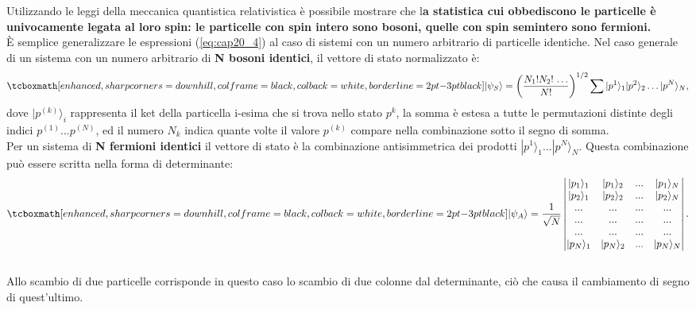 Utilizzando le leggi della meccanica quantistica relativistica è possibile mostrare che l\textbf{a statistica cui obbediscono le particelle è univocamente legata al loro spin: le particelle con spin intero sono bosoni, quelle con spin semintero sono fermioni.}\\

È semplice generalizzare le espressioni (\ref{eq:cap20_4}) al caso di sistemi con un numero arbitrario di particelle identiche. Nel caso generale di un sistema con un numero arbitrario di \textbf{N bosoni identici}, il vettore di stato normalizzato è:\\
	\begin{equation}
		\tcboxmath[enhanced, sharp corners=downhill, colframe=black, colback=white, borderline={2pt}{-3pt}{black}]{
			|\psi _S\rangle= \left(\frac{N_{1}! N_{2}!\,\dots}{N!}\right)^{1/2}   \sum  |p^1\rangle_{1} |p^2\rangle_{2} \dots |p^N\rangle_{N} , 
			}
	\end{equation}
dove $|p^{(k)}\rangle_i$ rappresenta il ket della particella i-esima che si trova nello stato $p^k$, la somma \`e estesa a tutte le permutazioni distinte degli indici $p^{(1)}...p^{(N)}$, ed il numero $N_{k}$ indica quante volte il valore $p^{(k)}$ compare nella combinazione sotto il segno di somma.\\

Per un sistema di \textbf{N fermioni identici} il vettore di stato \`e la combinazione antisimmetrica dei prodotti $|p^1\rangle_1...|p^N\rangle_N$. Questa combinazione pu\`o essere scritta nella forma di determinante:
	\begin{equation}
		\tcboxmath[enhanced, sharp corners=downhill, colframe=black, colback=white, borderline={2pt}{-3pt}{black}]{
			|\psi _A\rangle= \frac{1}{\sqrt{N}} \begin{vmatrix} |p_{1}\rangle_1 & |p_{1}\rangle_2 & ... & |p_{1}\rangle_N \\|p_{2}\rangle_1 & |p_{2}\rangle_2 & ... & |p_{2}\rangle_N \\ ... & ... & ... & ... \\ ... & ... & ... & ... \\ ... & ... & ... & ... \\|p_{N}\rangle_1 & |p_{N}\rangle_2 & ... & |p_{N}\rangle_N\end{vmatrix}.
			}
	\label{eq:cap20_5}
	\end{equation}\\
	
Allo scambio di due particelle corrisponde in questo caso lo scambio di due colonne dal determinante, ciò che causa il cambiamento di segno di quest'ultimo.\\

